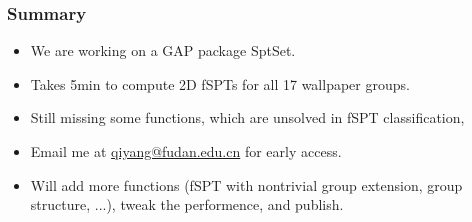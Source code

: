 \documentclass[xcolor=table, 11pt, aspectratio=1610]{beamer}
\begin{document}
%
\begin{frame}
  \frametitle{Summary}
  \begin{itemize}
  \item We are working on a GAP package SptSet.
  \item Takes 5min to compute 2D fSPTs for all 17 wallpaper groups.
  \item Still missing some functions, which are unsolved in fSPT classification,
  \item Email me at \url{qiyang@fudan.edu.cn} for early access.
  \item Will add more functions (fSPT with nontrivial group extension, group structure, ...), tweak the performence, and publish.
  \end{itemize}
\end{frame}
\end{document}
